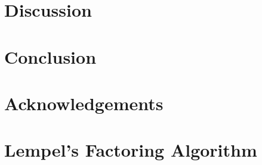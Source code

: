 \documentclass[notitlepage]{article}
\theoremstyle{definition}
\theoremstyle{problem}
\theoremstyle{lemma}
\begin{document}
	\FloatBarrier
	\section{Discussion}

	\section{Conclusion}

	\section{Acknowledgements}

	
	
	
	\appendix
	\section{Lempel's Factoring Algorithm}
	\label{ap_lempel}
\end{document}
